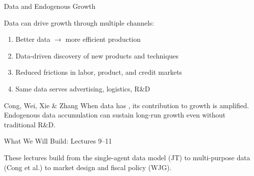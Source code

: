 \documentclass{beamer}
\begin{document}
\begin{frame}{Data and Endogenous Growth}

    Data can drive growth through multiple channels:

    \vspace{0.2em}
    \begin{enumerate}
        \item {} Better data $\rightarrow$ more efficient production
        \item {} Data-driven discovery of new products and techniques
        \item {} Reduced frictions in labor, product, and credit markets
        \item {} Same data serves advertising, logistics, R\&D
    \end{enumerate}

    \vspace{0.3em}
    \begin{exampleblock}{Cong, Wei, Xie \& Zhang}
        When data has , its contribution to growth is amplified. Endogenous data accumulation can sustain long-run growth even without traditional R\&D.
    \end{exampleblock}


\end{frame}

\begin{frame}{What We Will Build: Lectures 9--11}

    \begin{center}
    \end{center}

    \vspace{1em}
    These lectures build from the single-agent data model (JT) to multi-purpose data (Cong et al.) to market design and fiscal policy (WJG).

\end{frame}
\end{document}
